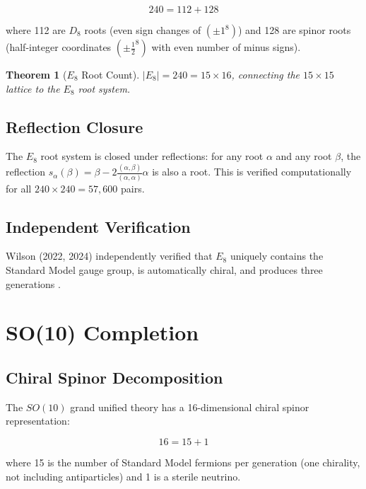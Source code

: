 \documentclass[11pt]{article}
\newtheorem{theorem}{Theorem}
\begin{document}
\begin{equation}
240 = 112 + 128
\end{equation}

where 112 are $D_8$ roots (even sign changes of $(\pm 1^8)$) and 128 are spinor roots (half-integer coordinates $(\pm \tfrac{1}{2}^8)$ with even number of minus signs).

\begin{theorem}[$E_8$ Root Count]
$|E_8| = 240 = 15 \times 16$, connecting the $15 \times 15$ lattice to the $E_8$ root system.
\end{theorem}

\subsection{Reflection Closure}

The $E_8$ root system is closed under reflections: for any root $\alpha$ and any root $\beta$, the reflection $s_\alpha(\beta) = \beta - 2\frac{(\alpha, \beta)}{(\alpha, \alpha)}\alpha$ is also a root. This is verified computationally for all $240 \times 240 = 57{,}600$ pairs.

\subsection{Independent Verification}

Wilson (2022, 2024) independently verified that $E_8$ uniquely contains the Standard Model gauge group, is automatically chiral, and produces three generations \cite{wilson2022e8, wilson2024e8}.

\section{SO(10) Completion}

\subsection{Chiral Spinor Decomposition}

The $SO(10)$ grand unified theory has a 16-dimensional chiral spinor representation:

\begin{equation}
16 = 15 + 1
\end{equation}

where 15 is the number of Standard Model fermions per generation (one chirality, not including antiparticles) and 1 is a sterile neutrino.
\end{document}
